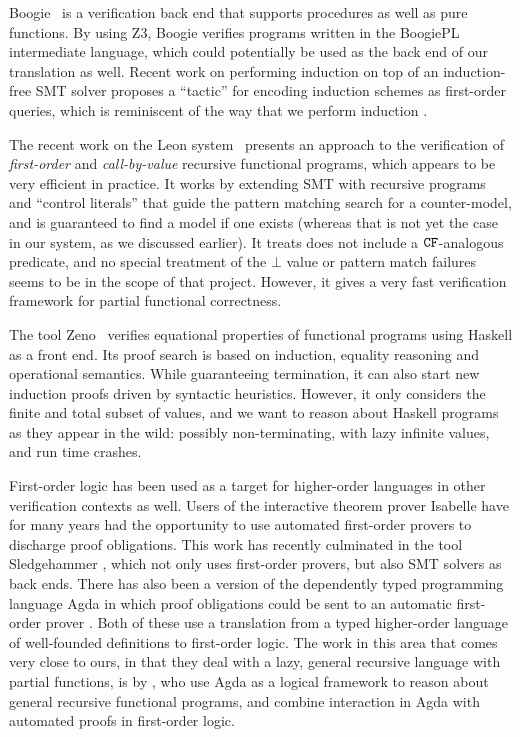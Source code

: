 Boogie~\cite{boogie} is a verification back end that supports procedures as well as
pure functions.  By using Z3, Boogie verifies
programs written in the BoogiePL intermediate language, 
which could potentially be used as the
back end of our translation as well. 
Recent work on performing induction on top of an
induction-free SMT solver proposes a ``tactic''
for encoding induction schemes as first-order queries, which is reminiscent of the way
that we perform induction \cite{Leino:2012:AIS:2189257.2189278}.

The recent work on the Leon system~\cite{Suter:2011:SMR:2041552.2041575} presents
an approach to the verification of {\em first-order} and {\em call-by-value}
recursive functional programs, which appears to be very efficient in practice.  It works
by extending SMT with recursive programs and ``control literals'' that guide the pattern
matching search for a counter-model, and is guaranteed to find a model if one exists
(whereas that is not yet the case in our system, as we discussed earlier). It 
treats does not include
a ${\tt CF}$-analogous predicate, and no special treatment of the $\bot$
value or pattern match failures seems to be in the scope of that project.
However, it gives a very fast verification framework for partial functional correctness.

The tool Zeno~\cite{zeno} verifies equational properties of functional
programs using Haskell as a front end. Its proof search is based on
induction, equality reasoning and operational semantics. While
guaranteeing termination, it can also start new induction proofs
driven by syntactic heuristics. However, it only considers the finite and total
subset of values, and we want to reason about Haskell
programs as they appear in the wild: possibly non-terminating, with
lazy infinite values, and run time crashes.


First-order logic has been used as a target for higher-order languages
in other verification contexts as well.  Users of the interactive
theorem prover Isabelle have for many years had the opportunity to use
automated first-order provers to discharge proof obligations. This
work has recently culminated in the tool
Sledgehammer \cite{Sledgehammer}, which not only uses first-order
provers, but also SMT solvers as back ends.  There has also been a version
of the dependently typed programming language Agda in which proof
obligations could be sent to an automatic first-order
prover \cite{AgdaFOL}. Both of these use a translation from a
typed higher-order language of well-founded definitions to first-order
logic. The work in this area that comes very close to ours, in
that they deal with a lazy, general recursive language with partial
functions, is by \citet{TypeTheoryFOL}, who use Agda as a logical
framework to reason about general recursive functional programs, and
combine interaction in Agda with automated proofs in first-order
logic.

